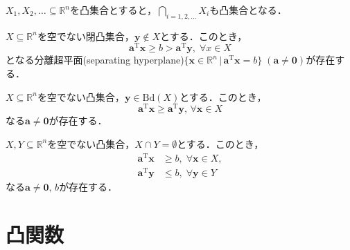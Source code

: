 \documentclass{jsreport}
\begin{document}
\begin{lemm}\label{lemm:convex}
  $X_1, X_2, \ldots \subseteq \mathbb{R}^n$を凸集合とすると，$\bigcap \limits_{i = 1, 2, \ldots} X_i$も凸集合となる．
\end{lemm}

\begin{lemm}[分離超平面の存在]\label{lemm:hyperplane1}
  $X \subseteq \mathbb{R}^n$を空でない閉凸集合，$\bm{y} \notin X$とする．このとき，
  \begin{equation}
    \bm{a}^{\mathrm{T}}\bm{x} \geq b > \bm{a}^{\mathrm{T}}\bm{y}, \; \forall x \in X \nonumber
  \end{equation}
  となる分離超平面(separating hyperplane)$\{\bm{x} \in \mathbb{R}^n \, | \, \bm{a}^{\mathrm{T}} \bm{x} = b\} \; (\bm{a} \neq \bm{0})$が存在する．
\end{lemm}


\begin{lemm}\label{lemm:hyperplane2}
  $X \subseteq \mathbb{R}^n$を空でない凸集合，$\bm{y} \in \mathrm{Bd}(X)$とする．このとき，
  \begin{equation}
    \bm{a}^{\mathrm{T}} \bm{x} \geq \bm{a}^{\mathrm{T}} \bm{y}, \, \forall \bm{x} \in X \nonumber
  \end{equation}
  なる$\bm{a} \neq \bm{0}$が存在する．
\end{lemm}

\begin{lemm}\label{lemm:hyperplane3}
  $X, Y \subseteq \mathbb{R}^n$を空でない凸集合，$X \cap Y = \emptyset$とする．このとき，
  \begin{align}
    \bm{a}^{\mathrm{T}}\bm{x} &\geq b, \; \forall \bm{x} \in X, \nonumber \\
    \bm{a}^{\mathrm{T}}\bm{y} &\leq b, \; \forall \bm{y} \in Y \nonumber
  \end{align}
  なる$\bm{a} \neq \bm{0}, \, b$が存在する．
\end{lemm}

\section{凸関数}
\end{document}
